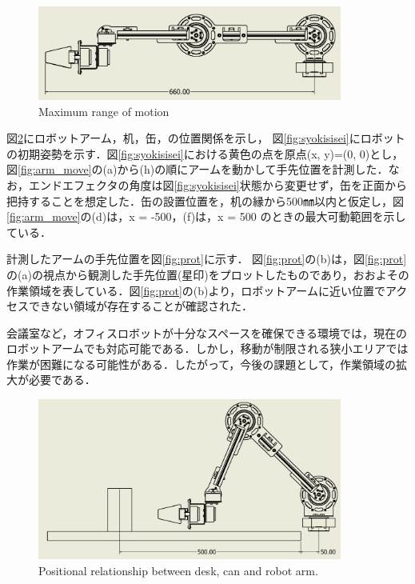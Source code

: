 \begin{figure}[t]
  \centering
  \includegraphics[width=10cm]{images/design/arm_long.png}
  \caption{Maximum range of motion}
  \label{fig:arm_long}
\end{figure}
\clearpage

図\ref{fig:arm_size}にロボットアーム，机，缶，の位置関係を示し，
図\ref{fig:syokisisei}にロボットの初期姿勢を示す．図\ref{fig:syokisisei}における黄色の点を原点(x, y)=(0, 0)とし，図\ref{fig:arm_move}の(a)から(h)の順にアームを動かして手先位置を計測した．なお，エンドエフェクタの角度は図\ref{fig:syokisisei}状態から変更せず，缶を正面から把持することを想定した．缶の設置位置を，机の縁から500㎜以内と仮定し，図\ref{fig:arm_move}の(d)は，x = -500，(f)は，x = 500 のときの最大可動範囲を示している．

計測したアームの手先位置を図\ref{fig:prot}に示す．
図\ref{fig:prot}の(b)は，図\ref{fig:prot}の(a)の視点から観測した手先位置(星印)をプロットしたものであり，おおよその作業領域を表している．図\ref{fig:prot}の(b)より，ロボットアームに近い位置でアクセスできない領域が存在することが確認された．

会議室など，オフィスロボットが十分なスペースを確保できる環境では，現在のロボットアームでも対応可能である．しかし，移動が制限される狭小エリアでは作業が困難になる可能性がある．したがって，今後の課題として，作業領域の拡大が必要である．

\begin{figure}[h]
  \centering
  \includegraphics[width=10cm]{images/design/hikaku.png}
  \caption{Positional relationship between desk, can and robot arm.}
  \label{fig:arm_size}
\end{figure}

